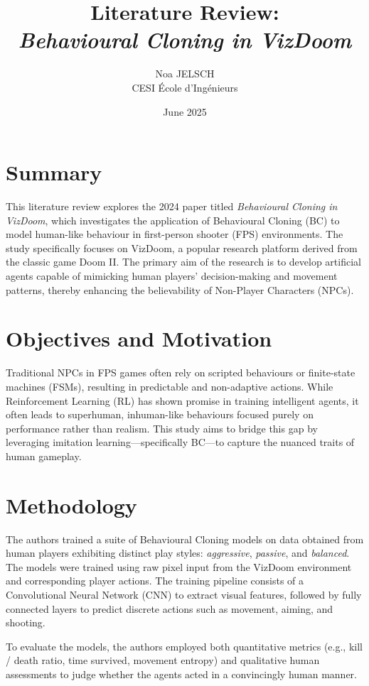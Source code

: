 \documentclass[12pt,a4paper]{article}
\title{Literature Review:\\\textit{Behavioural Cloning in VizDoom}}
\author{Noa JELSCH\\CESI École d'Ingénieurs}
\date{June 2025}
\begin{document}
\maketitle

\section*{Summary}

This literature review explores the 2024 paper titled \textit{Behavioural Cloning in VizDoom}, which investigates the application of Behavioural Cloning (BC) to model human-like behaviour in first-person shooter (FPS) environments. The study specifically focuses on VizDoom, a popular research platform derived from the classic game Doom II. The primary aim of the research is to develop artificial agents capable of mimicking human players' decision-making and movement patterns, thereby enhancing the believability of Non-Player Characters (NPCs).

\section*{Objectives and Motivation}

Traditional NPCs in FPS games often rely on scripted behaviours or finite-state machines (FSMs), resulting in predictable and non-adaptive actions. While Reinforcement Learning (RL) has shown promise in training intelligent agents, it often leads to superhuman, inhuman-like behaviours focused purely on performance rather than realism. This study aims to bridge this gap by leveraging imitation learning—specifically BC—to capture the nuanced traits of human gameplay.

\section*{Methodology}

The authors trained a suite of Behavioural Cloning models on data obtained from human players exhibiting distinct play styles: \textit{aggressive}, \textit{passive}, and \textit{balanced}. The models were trained using raw pixel input from the VizDoom environment and corresponding player actions. The training pipeline consists of a Convolutional Neural Network (CNN) to extract visual features, followed by fully connected layers to predict discrete actions such as movement, aiming, and shooting.

To evaluate the models, the authors employed both quantitative metrics (e.g., kill / death ratio, time survived, movement entropy) and qualitative human assessments to judge whether the agents acted in a convincingly human manner.
\end{document}
